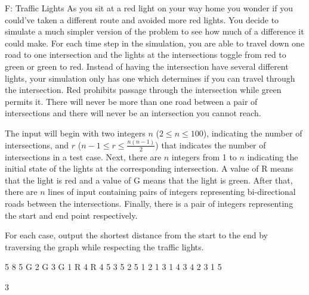 \begin{problem}{F: Traffic Lights}
As you sit at a red light on your way home you wonder if you could’ve taken a different route and avoided more red lights. You decide to simulate a much simpler version of the problem to see how much of a difference it could make. For each time step in the simulation, you are able to travel down one road to one intersection and the lights at the intersections toggle from red to green or green to red. Instead of having the intersection have several different lights, your simulation only has one which determines if you can travel through the intersection. Red prohibits passage through the intersection while green permits it. There will never be more than one road between a pair of intersections and there will never be an intersection you cannot reach.
\end{problem}

\begin{formalin}
The input will begin with two integers $n$ ($2 \leq n \leq 100$), indicating the number of intersections, and $r$ ($n - 1 \leq r \leq \frac{n(n -1)}{2}$) that indicates the number of intersections in a test case. Next, there are $n$ integers from 1 to $n$ indicating the initial state of the lights at the corresponding intersection. A value of R means that the light is red and a value of G means that the light is green. After that, there are $n$ lines of input containing pairs of integers representing bi-directional roads between the intersections. Finally, there is a pair of integers representing the start and end point respectively.
\end{formalin}

\begin{formalout}
For each case, output the shortest distance from the start to the end by traversing the graph while respecting the traffic lights.
\end{formalout}

\begin{datain}
5 8
5 G
2 G
3 G
1 R
4 R
4 5
3 5
2 5
1 2
1 3
1 4
3 4
2 3
1 5
\end{datain}

\begin{dataout}
3
\end{dataout}

